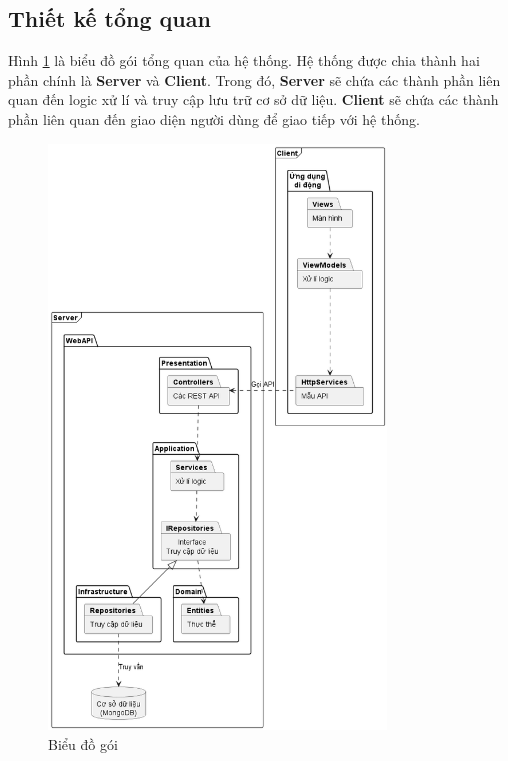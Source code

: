 \documentclass[../DoAn.tex]{subfiles}
\begin{document}
\subsection{Thiết kế tổng quan}
\label{subsection:systemdesign-general}
Hình \ref{fig:package} là biểu đồ gói tổng quan của hệ thống. Hệ thống được chia thành hai phần chính là \textbf{Server} và \textbf{Client}. Trong đó, \textbf{Server} sẽ chứa các thành phần liên quan đến logic xử lí và truy cập lưu trữ cơ sở dữ liệu. \textbf{Client} sẽ chứa các thành phần liên quan đến giao diện người dùng để giao tiếp với hệ thống.
\begin{figure}[H]
    \centering
    \includegraphics[width=0.8\textwidth]{Hinhve/design/package/General}
    \caption{Biểu đồ gói}
    \label{fig:package}
\end{figure}
\vfill
\break
\end{document}
